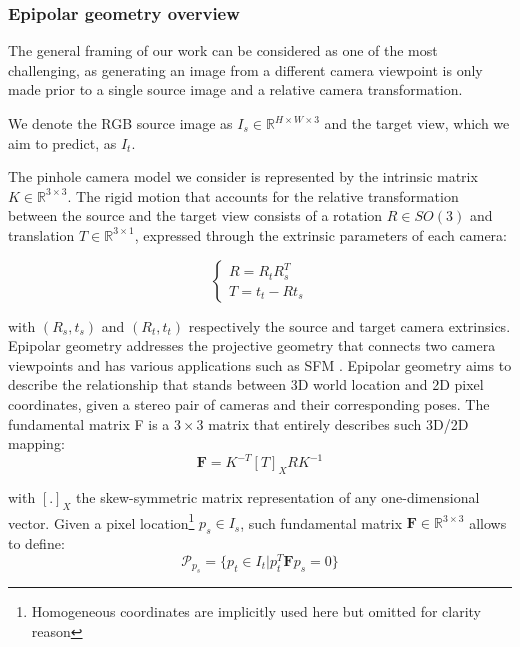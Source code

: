 \subsubsection{Epipolar geometry overview }

The general framing of our work can be considered as one of the most challenging, as generating an  image from a different camera viewpoint is only made prior to a single source image and a relative camera transformation. 

We denote the RGB source image as $I_{s} \in \mathbb{R}^{H\times W\times 3}$ and the target view, which we aim to predict, as $I_{t}$.

The pinhole camera model we consider is represented by the intrinsic matrix $K \in \mathbb{R}^{3\times3}$. The rigid motion that accounts for the relative transformation between the source and the target view consists of a rotation $R \in SO(3)$ and translation $T\in \mathbb{R}^{3\times1}$, expressed through the extrinsic parameters of each camera:

\begin{equation}
     \begin{cases}
     R = R_{t} R_{s}^{T} \\
     T = t_{t} - R t_{s}
     \end{cases}
\end{equation}

with $(R_{s},t_{s})$ and $(R_{t},t_{t})$ respectively the source and target camera extrinsics. Epipolar geometry \citep{hartley2003multiple} addresses the projective geometry that connects two camera viewpoints and has various applications such as \ac{SFM} \citep{tamaazousti2011nonlinear}. Epipolar geometry aims to describe the relationship that stands between 3D world location and 2D pixel coordinates, given a stereo pair of cameras and their corresponding poses. The fundamental matrix F is a $3\times3$ matrix that entirely describes such 3D/2D mapping: 
\begin{equation}
    \mathbf{F} = K^{-T} [T]_{X} R  K^{-1}
\end{equation}

with $[.]_{X}$ the skew-symmetric matrix representation of any one-dimensional vector. Given a pixel location\footnote{Homogeneous coordinates are implicitly used here but omitted for clarity reason} $p_{s}\in I_{s}$, such fundamental matrix $\mathbf{F} \in \mathbb{R}^{3\times3}$ allows to define: 
\begin{equation}
    \mathcal{P}_{p_{s}} = \{p_{t}\in I_{t} | p_{t}^{T}\mathbf{F}p_{s} = 0 \}
\end{equation}

